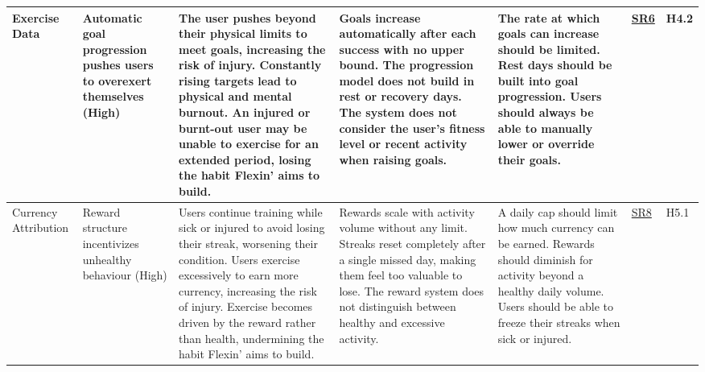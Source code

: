 \documentclass{article}
\begin{document}
\begin{landscape}
{\begin{longtable}{|p{2.5cm}|p{3cm}|p{3.8cm}|p{3.8cm}|p{5.5cm}|p{1.8cm}|p{1cm}|}
            \hline
            Exercise Data & Automatic goal progression pushes users to overexert themselves (High) & \textbullet{} The user pushes beyond their physical limits to meet goals, increasing the risk of injury. \newline \textbullet{} Constantly rising targets lead to physical and mental burnout. \newline \textbullet{} An injured or burnt-out user may be unable to exercise for an extended period, losing the habit Flexin' aims to build. & \textbullet{} Goals increase automatically after each success with no upper bound. \newline \textbullet{} The progression model does not build in rest or recovery days. \newline \textbullet{} The system does not consider the user's fitness level or recent activity when raising goals. & \textbullet{} The rate at which goals can increase should be limited. \newline \textbullet{} Rest days should be built into goal progression. \newline \textbullet{} Users should always be able to manually lower or override their goals. & \hyperlink{sr6}{SR6} & H4.2 \\
            \hline
            Currency Attribution & Reward structure incentivizes unhealthy behaviour (High) & \textbullet{} Users continue training while sick or injured to avoid losing their streak, worsening their condition. \newline \textbullet{} Users exercise excessively to earn more currency, increasing the risk of injury. \newline \textbullet{} Exercise becomes driven by the reward rather than health, undermining the habit Flexin' aims to build. & \textbullet{} Rewards scale with activity volume without any limit. \newline \textbullet{} Streaks reset completely after a single missed day, making them feel too valuable to lose. \newline \textbullet{} The reward system does not distinguish between healthy and excessive activity. & \textbullet{} A daily cap should limit how much currency can be earned. \newline \textbullet{} Rewards should diminish for activity beyond a healthy daily volume. \newline \textbullet{} Users should be able to freeze their streaks when sick or injured. & \hyperlink{sr8}{SR8} & H5.1 \\

\end{longtable}}
\end{landscape}
\end{document}
